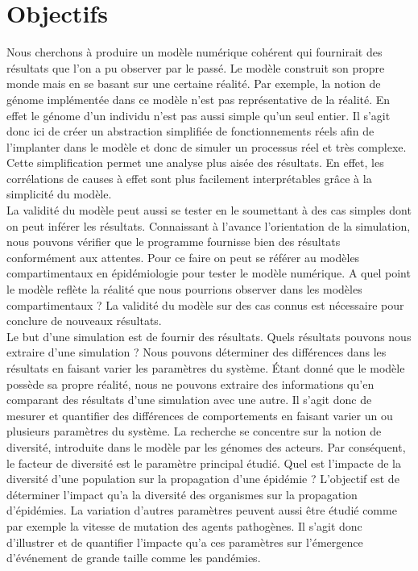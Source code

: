 \chapter{Objectifs} \label{ch:intro}

Nous cherchons à produire un modèle numérique cohérent qui fournirait des résultats que l'on a pu observer par le passé. Le modèle construit son propre monde mais en se basant sur une certaine réalité. Par exemple, la notion de génome implémentée dans ce modèle n'est pas représentative de la réalité. En effet le génome d'un individu n'est pas aussi simple qu'un seul entier. Il s'agit donc ici de créer un abstraction simplifiée de fonctionnements réels afin de l'implanter dans le modèle et donc de simuler un processus réel et très complexe. Cette simplification permet une analyse plus aisée des résultats. En effet, les corrélations de causes à effet sont plus facilement interprétables grâce à la simplicité du modèle.\\

La validité du modèle peut aussi se tester en le soumettant à des cas simples dont on peut inférer les résultats. Connaissant à l'avance l'orientation de la simulation, nous pouvons vérifier que le programme fournisse bien des résultats conformément aux attentes. Pour ce faire on peut se référer au modèles compartimentaux en épidémiologie pour tester le modèle numérique. A quel point le modèle reflète la réalité que nous pourrions observer dans les modèles compartimentaux ? La validité du modèle sur des cas connus est nécessaire pour conclure de nouveaux résultats. \\

Le but d'une simulation est de fournir des résultats. Quels résultats pouvons nous extraire d'une simulation ? Nous pouvons déterminer des différences dans les résultats en faisant varier les paramètres du système. Étant donné que le modèle possède sa propre réalité, nous ne pouvons extraire des informations qu'en comparant des résultats d'une simulation avec une autre. Il s'agit donc de mesurer et quantifier des différences de comportements en faisant varier un ou plusieurs paramètres du système. La recherche se concentre sur la notion de diversité, introduite dans le modèle par les génomes des acteurs. Par conséquent, le facteur de diversité est le paramètre principal étudié. Quel est l'impacte de la diversité d'une population sur la propagation d'une épidémie ?  L'objectif est de déterminer l'impact qu'a la diversité des organismes sur la propagation d'épidémies. La variation d'autres paramètres peuvent aussi être étudié comme par exemple la vitesse de mutation des agents pathogènes. Il s'agit donc d'illustrer et de quantifier l'impacte qu'a ces paramètres sur l'émergence d'événement de grande taille comme les pandémies.\\

